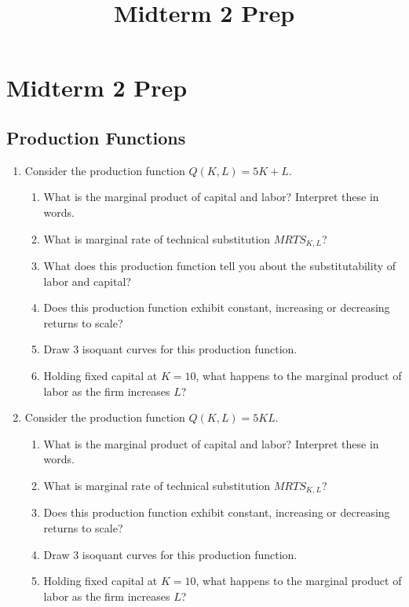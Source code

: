 \documentclass[11pt]{article}
\title{Midterm 2 Prep}
\begin{document}
  
\section*{Midterm 2 Prep}

\subsection*{Production Functions}
\begin{enumerate}
  \item Consider the production function $Q(K, L) = 5K + L$. 
  \begin{enumerate}
    \item What is the marginal product of capital and labor? Interpret these in words.
    
    \item What is marginal rate of technical substitution $MRTS_{K, L}$? 
    
    \item What does this production function tell you about the substitutability of labor and capital?
    
    \item Does this production function exhibit constant, increasing or decreasing returns to scale?
    
    \item Draw 3 isoquant curves for this production function.
    
    \item Holding fixed capital at $K = 10$, what happens to the marginal product of labor as the firm increases $L$?
  \end{enumerate}

  \item Consider the production function $Q(K, L) = 5KL$. 
  \begin{enumerate}
    \item What is the marginal product of capital and labor? Interpret these in words.
    
    \item What is marginal rate of technical substitution $MRTS_{K, L}$? 
    
    \item Does this production function exhibit constant, increasing or decreasing returns to scale?
    
    \item Draw 3 isoquant curves for this production function.

    \item Holding fixed capital at $K = 10$, what happens to the marginal product of labor as the firm increases $L$?
    

\end{enumerate}
\end{enumerate}
\end{document}
